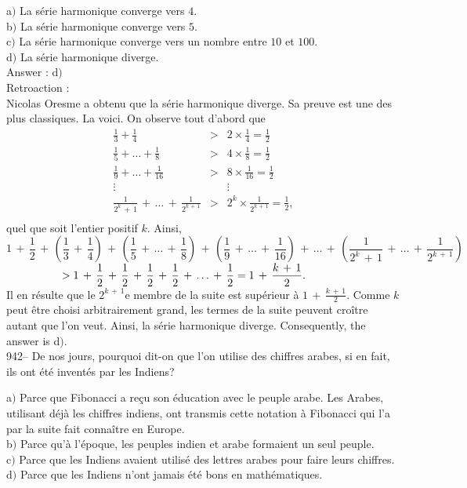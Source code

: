 ﻿\documentclass[letterpaper, 12pt]{article}
\begin{document}
a$)$ La s\'erie harmonique converge vers $4$. \\
b$)$ La s\'erie harmonique converge vers $5$. \\
c$)$ La s\'erie harmonique converge vers un nombre entre $10$ et $100$. \\
d$)$ La s\'erie harmonique diverge.\\

Answer : d$)$\\

Retroaction :\\
Nicolas Oresme a obtenu que la s\'erie harmonique diverge. Sa preuve
est une des plus classiques. La voici. On observe tout d'abord que
$$\begin{array}{rcl}
\displaystyle{\frac13+\frac14}                      & > &
\displaystyle{2\times\frac14=\frac12} \\ [3mm]
\displaystyle{\frac15+\ldots+\frac18}               & > &
\displaystyle{4\times\frac18=\frac12} \\ [3mm]
\displaystyle{\frac19+\ldots+\frac1{16}}            & > &
\displaystyle{8\times\frac1{16}=\frac12} \\ [3mm] \vdots &   &
\vdots \\ [3 mm]
\displaystyle{\frac1{2^k\,+\,1}\,+\,\ldots\,+\,\frac1{2^{k\,+\,1}}}
& > & \displaystyle{2^k\times\frac1{2^{k\,+\,1}}=\frac12}, \\ [3mm]
\end{array}$$
quel que soit l'entier positif $k$. Ainsi,
$$\displaystyle{1\,+\,\frac12\,+\,\left(\frac13\,+\,\frac14\right)\,+\,\left(\frac15\,+\,\ldots\,+\,\frac18\right)\,+\,\left(\frac19\,+\,\ldots\,+\,\frac1{16}\right)\,+\,\ldots\,+\,
\left(\frac1{2^k\,+\,1}\,+\,\ldots\,+\,\frac1{2^{k\,+\,1}}\right)}$$
$\hskip 50 pt >
\displaystyle{1\,+\,\frac12\,+\,\frac12\,+\,\frac12\,+\,\frac12\,+\,\ldots\,+\,\frac12=1\,+\,\frac{k\,+\,1}2}.$\\[3mm]
Il en r\'esulte que le $2^{k\,+\,1}$e membre de la suite est
sup\'erieur \`a $1\,+\,\frac{k\,+\,1}2$. Comme $k$ peut \^etre
choisi arbitrairement grand,
les termes de la suite peuvent cro\^itre autant que l'on veut. Ainsi, la
s\'erie harmonique diverge. Consequently, the answer is d$)$.\\

942-- De nos jours, pourquoi dit-on que l'on utilise des chiffres
arabes, si en fait, ils ont \'et\'e invent\'es par les Indiens?

a$)$ Parce que Fibonacci a re\c cu son \'education avec le peuple
arabe. Les Arabes, utilisant d\'ej\`a les chiffres indiens, ont
transmis
cette notation \`a Fibonacci qui l'a par la suite fait conna\^itre en
Europe. \\
b$)$ Parce qu'\`a l'\'epoque, les peuples indien et arabe formaient un seul
peuple.  \\
c$)$ Parce que les Indiens avaient utilis\'e des lettres arabes pour faire
leurs chiffres. \\
d$)$ Parce que les Indiens n'ont jamais \'et\'e bons en math\'ematiques.\\
\end{document}
